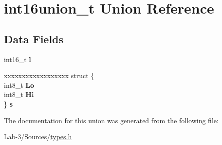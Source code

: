 \hypertarget{unionint16union__t}{}\section{int16union\+\_\+t Union Reference}
\label{unionint16union__t}
\subsection*{Data Fields}
\begin{DoxyCompactItemize}
\item 
\mbox{\label{unionint16union__t_ae74eca52708829f81803fc3410392a78}} 
int16\+\_\+t {\bfseries l}
\item 
\mbox{\label{unionint16union__t_a3a5575c9014dbe8319f7071bc9fda2d1}} 
\begin{tabbing}
xx\=xx\=xx\=xx\=xx\=xx\=xx\=xx\=xx\=\kill
struct \{\\
\>int8\_t {\bfseries Lo}\\
\>int8\_t {\bfseries Hi}\\
\} {\bfseries s}\\

\end{tabbing}\end{DoxyCompactItemize}


The documentation for this union was generated from the following file\+:\begin{DoxyCompactItemize}
\item 
Lab-\/3/\+Sources/\hyperlink{types_8h}{types.\+h}\end{DoxyCompactItemize}
